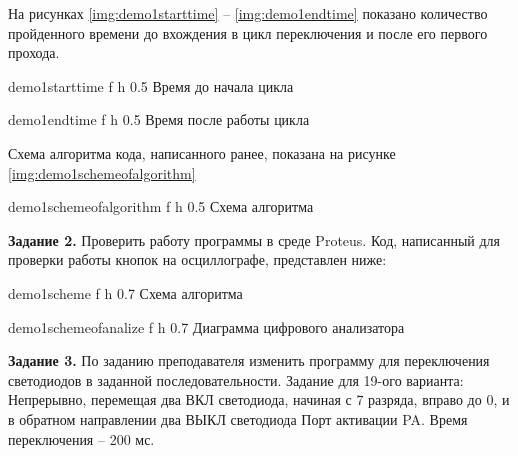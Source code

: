 \documentclass{bmstu}
\begin{document}
На рисунках \ref{img:demo1starttime} -- \ref{img:demo1endtime} показано количество пройденного времени до
вхождения в цикл переключения и после его первого прохода.


    {demo1starttime} %
    {f} %
    {h} %
    {0.5\textwidth} %
    {Время до начала цикла} %

    {demo1endtime} %
    {f} %
    {h} %
    {0.5\textwidth} %
    {Время после работы цикла} %

Схема алгоритма кода, написанного ранее, показана на рисунке \ref{img:demo1schemeofalgorithm}

    {demo1schemeofalgorithm} %
    {f} %
    {h} %
    {0.5\textwidth} %
    {Схема алгоритма} %
    
\newpage

\textbf{Задание 2.}
\newline
Проверить работу программы в среде Proteus.
Код, написанный для проверки работы кнопок на осциллографе,
представлен ниже:

    {demo1scheme} %
    {f} %
    {h} %
    {0.7\textwidth} %
    {Схема алгоритма} %

    {demo1schemeofanalize} %
    {f} %
    {h} %
    {0.7\textwidth} %
    {Диаграмма цифрового анализатора} %

\newpage
\textbf{Задание 3.}
\newline
По заданию преподавателя изменить программу для переключения
светодиодов в заданной последовательности.
Задание для 19-ого варианта:
Непрерывно, перемещая два ВКЛ светодиода,
начиная с 7 разряда, вправо до 0,
и в обратном направлении два ВЫКЛ светодиода
Порт активации PA.
Время переключения – 200 мс.
\end{document}
